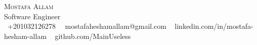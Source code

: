 \documentclass[letterpaper,11pt]{article}
\newcommand{\resumeSubHeadingListStart}{\begin{itemize}[leftmargin=0.0in, label={}]}
\newcommand{\resumeSubHeadingListEnd}{\end{itemize}}
\begin{document}

\begin{center}
    {\Huge \scshape Mostafa Allam} \\ \vspace{1pt}
    Software Engineer \\ \vspace{1pt}
    \small \raisebox{-0.1\height}\ +201032126278 ~{\raisebox{-0.2\height}\ mostafaheshamallam@gmail.com} ~ 
{\raisebox{-0.2\height}linkedin.com/in/mostafa-hesham-allam}  ~
{\raisebox{-0.2\height}github.com/MainUseless}
    \vspace{-8pt}
\end{center}

\end{document}
